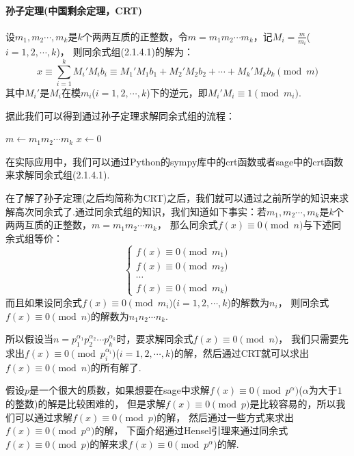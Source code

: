 \documentclass{article}
\numberwithin{equation}{subsubsection}
\begin{document}
\paragraph{孙子定理(中国剩余定理，CRT)}
设$m_1,m_2\cdots,m_k$是$k$个两两互质的正整数，令$m=m_1m_2\cdots m_k$，记$M_i=\frac{m}{m_i}$($i=1,2,\cdots,k$)，
则同余式组(2.1.4.1)的解为：
\begin{equation}
    x\equiv \sum_{i=1}^{k}M_i'M_ib_i\equiv M_1'M_1b_1+M_2'M_2b_2+\cdots+M_k'M_kb_k\pmod{m}
    \nonumber
\end{equation}
其中$M_i'$是$M_i$在模$m_i$($i=1,2,\cdots,k$)下的逆元，即$M_i'M_i\equiv 1\pmod{m_i}$.\par
据此我们可以得到通过孙子定理求解同余式组的流程：
\begin{algorithm}
    \caption{$\text{CRT}(b_1,b_2,\cdots,b_k;m_1,m_2,\cdots,m_k)$}
    $m\leftarrow m_1m_2\cdots m_k$
    $x\leftarrow 0$\\
\end{algorithm}\par
在实际应用中，我们可以通过Python的sympy库中的crt函数或者sage中的crt函数来求解同余式组(2.1.4.1).\par
在了解了孙子定理(之后均简称为CRT)之后，我们就可以通过之前所学的知识来求解高次同余式了.通过同余式组的知识，我们知道如下事实：若$m_1,m_2\cdots,m_k$是$k$个两两互质的正整数，$m= m_1m_2\cdots m_k$，
那么同余式$f(x)\equiv 0\pmod{n}$与下述同余式组等价：
\begin{equation}
    \begin{cases}
        f(x)\equiv 0\pmod{m_1}\\
        f(x)\equiv 0\pmod{m_2}\\
        \cdots\\
        f(x)\equiv 0\pmod{m_k}
    \end{cases}
    \nonumber
\end{equation}
而且如果设同余式$f(x)\equiv 0\pmod{m_i}$($i=1,2,\cdots,k$)的解数为$n_i$，
则同余式$f(x)\equiv 0\pmod{n}$的解数为$n_1n_2\cdots n_k$.\par
所以假设当$n=p_1^{\alpha_1}p_2^{\alpha_2}\cdots p_k^{\alpha_k}$时，要求解同余式$f(x)\equiv 0\pmod{n}$，
我们只需要先求出$f(x)\equiv 0\pmod{p_i^{\alpha_i}}$($i=1,2,\cdots,k$)的解，然后通过CRT就可以求出$f(x)\equiv 0\pmod{n}$的所有解了.\par
假设$p$是一个很大的质数，如果想要在sage中求解$f(x)\equiv 0\pmod{p^\alpha}$($\alpha$为大于$1$的整数)的解是比较困难的，
但是求解$f(x)\equiv 0\pmod{p}$是比较容易的，所以我们可以通过求解$f(x)\equiv 0\pmod{p}$的解，
然后通过一些方式来求出$f(x)\equiv 0\pmod{p^\alpha}$的解，
下面介绍通过Hensel引理来通过同余式$f(x)\equiv 0\pmod{p}$的解来求$f(x)\equiv 0\pmod{p^\alpha}$的解.\par
\end{document}
